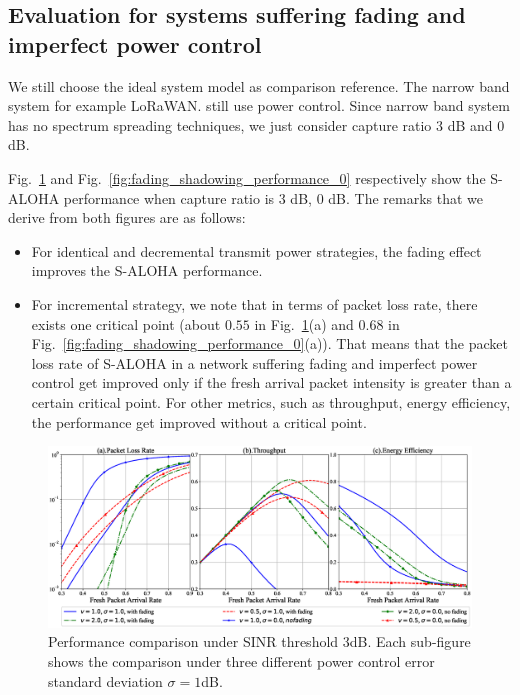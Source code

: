 \subsection{Evaluation for systems suffering fading and imperfect power control}
We still choose the ideal system model as comparison reference. The narrow band system for example LoRaWAN. still use power control.
Since narrow band system has no spectrum spreading techniques, we just consider capture ratio $3$ dB and $0$dB.

Fig.~\ref{fig:fading_shadowing_performance_3} and Fig.~\ref{fig:fading_shadowing_performance_0} respectively show the S-ALOHA performance when capture ratio is $3$ dB, $0$ dB. The remarks that we derive from both figures are as follows:
\begin{itemize}[leftmargin=*, noitemsep]
	\item For identical and decremental transmit power strategies, the fading effect improves the S-ALOHA performance. 
	\item For incremental strategy, we note that in terms of packet loss rate, there exists one critical point (about $0.55$ in Fig.~\ref{fig:fading_shadowing_performance_3}(a) and $0.68$ in Fig.~\ref{fig:fading_shadowing_performance_0}(a)). That means that the packet loss rate of S-ALOHA in a network suffering fading and imperfect power control get improved only if the fresh arrival packet intensity is greater than a certain critical point. For other metrics, such as throughput, energy efficiency, the performance get improved without a critical point.
\end{itemize}

\begin{figure}[!th]
	\centering
	\includegraphics[width=1.0\linewidth]{Chapter4/Figures/fading_shadowing_performance_case_3.0.eps}
	\caption{Performance comparison under SINR threshold $3$dB. Each sub-figure shows the comparison under three different power control error standard deviation $\sigma = 1$dB.}
	\label{fig:fading_shadowing_performance_3}
\end{figure}

